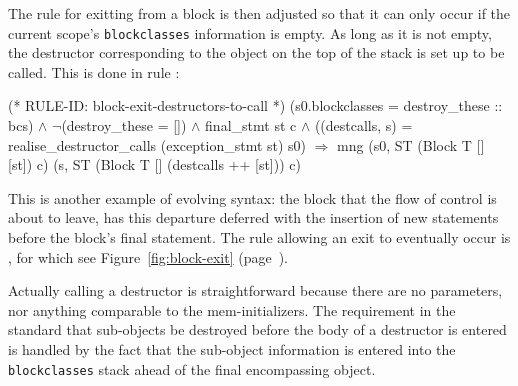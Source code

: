 \documentclass[11pt]{article}
\begin{document}
The rule for exitting from a block is then adjusted so that it can
only occur if the current scope's \texttt{blockclasses} information is
empty.  As long as it is not empty, the destructor corresponding to
the object on the top of the stack is set up to be called.  This is
done in rule :
\begin{stdrule}
(* RULE-ID: block-exit-destructors-to-call *)
     (s0.blockclasses = destroy_these :: bcs) \(\land\)
     \(\neg\)(destroy_these = []) \(\land\)
     final_stmt st c \(\land\)
     ((destcalls, s) =
        realise_destructor_calls (exception_stmt st) s0)
   \(\Rightarrow\)
     mng (s0, ST (Block T [] [st]) c)
         (s, ST (Block T [] (destcalls ++ [st])) c)
\end{stdrule}
This is another example of evolving syntax: the block that the flow of
control is about to leave, has this departure deferred with the
insertion of new statements before the block's final statement.  The
rule allowing an exit to eventually occur is , for
which see Figure~\ref{fig:block-exit} (page~\pageref{fig:block-exit}).

Actually calling a destructor is straightforward because there are no
parameters, nor anything comparable to the mem-initializers.  The
requirement in the standard that sub-objects be destroyed before the
body of a destructor is entered is handled by the fact that the
sub-object information is entered into the \texttt{blockclasses} stack
ahead of the final encompassing object.
\end{document}
